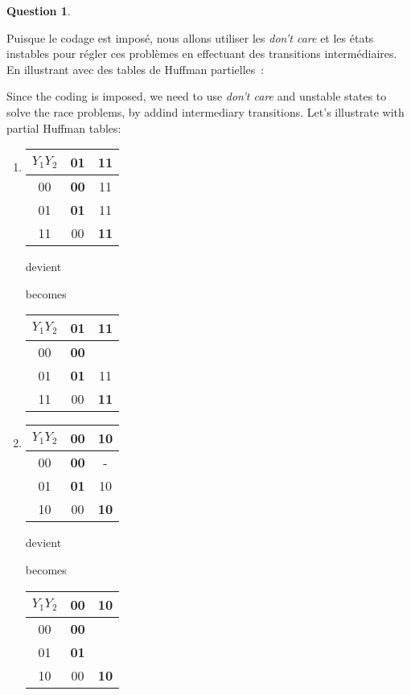 \documentclass[11pt,a4paper,dvipsnames]{article}
\theoremstyle{definition}%
\newtheorem{Q}{Question}[] %
\newcommand{\fr}[1]{
 	\ifthenelse {\boolean{fr}} {#1} {}
 }
\newcommand{\en}[1]{
 	\ifthenelse {\boolean{en}} {#1} {}
 }
\begin{document}
\begin{Q}
\begin{enumerate}
{			\fr{Puisque le codage est imposé, nous allons utiliser les \textit{don't care} et les états instables pour régler ces problèmes en effectuant des transitions intermédiaires.
			En illustrant avec des tables de Huffman partielles~:}
			\en{Since the coding is imposed, we need to use \textit{don't care} and unstable states to solve the race problems, by addind intermediary transitions.
			Let's illustrate with partial Huffman tables:}
			\begin{enumerate}
				\item 
					\begin{tabular}{|c|c|c|}\hline
					$Y_1Y_2$ & 01 & 11 \\ \hline
					00 & \textbf{00} & 11 \\ \hline
					01 & \textbf{01} & 11 \\ \hline
					11 & 00 & \textbf{11} \\ \hline
					\end{tabular}
					\fr{devient}
					\en{becomes}
					\begin{tabular}{|c|c|c|}\hline
					$Y_1Y_2$ & 01 & 11 \\ \hline
					00 & \textbf{00} & \color{red}{01} \\ \hline
					01 & \textbf{01} & 11 \\ \hline
					11 & 00 & \textbf{11} \\ \hline
					\end{tabular}

				\item
				\begin{tabular}{|c|c|c|}\hline
					$Y_1Y_2$ & 00 & 10 \\ \hline
					00 & \textbf{00} & - \\ \hline
					01 & \textbf{01} & 10 \\ \hline
					10 & 00 & \textbf{10} \\ \hline
				\end{tabular}
					\fr{devient}
					\en{becomes}
				\begin{tabular}{|c|c|c|}\hline
					$Y_1Y_2$ & 00 & 10 \\ \hline
					00 & \textbf{00} & \color{red}{10} \\ \hline
					01 & \textbf{01} & \color{red}{00} \\ \hline
					10 & 00 & \textbf{10} \\ \hline
				\end{tabular}


\end{enumerate}}
\end{enumerate}
\end{Q}
\end{document}
